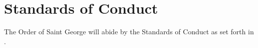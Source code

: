 {
\section{Standards of Conduct}
The Order of Saint George will abide by the Standards of Conduct as set forth in \crimson.
}